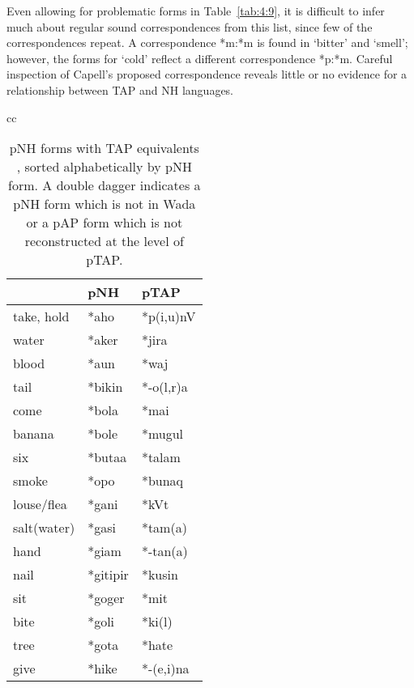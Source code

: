Even allowing for problematic forms in Table~\ref{tab:4:9}, it is difficult to infer much about regular sound correspondences from this list, since few of the correspondences repeat. A correspondence *m:*m is found in `bitter' and `smell'; however, the forms for `cold' reflect a different correspondence *p:*m. 
\enlargethispage{2em}
Careful inspection of Capell's proposed correspondence reveals little or no evidence for a relationship between TAP and NH languages.

\begin{table}[p]
\centering
\caption[pNH forms with TAP equivalents A-M]{pNH forms \citep[after][]{Wada1980} with TAP equivalents \citep[after][]{SchapperEtAlTVtimor}, sorted alphabetically by pNH form. A double dagger {\ddag} indicates a pNH form which is not in Wada or a pAP form which is not reconstructed at the level of pTAP.\footnotemark{}} 
\label{table_pNH}
\label{tab:4:10}
\footnotesize
\begin{tabular}{cc}
\mytopline
\begin{tabular}{lll}
 	&  \rm \textbf{pNH\ilt{proto-North-Halmahera}}	& \rm \textbf{pTAP\ilt{proto-Timor Alor Pantar}}\\
    \midrule
take, hold&   *aho	&   *p(i,u)nV {\ddag}\\
water	&   *aker	&  *jira\\
blood	&  *aun	&  *waj\\
tail	&  *bikin	&  *-o(l,r)a\footnotemark{}\\
{\lightgreycell}come	& {\lightgreycell} *bola	& {\lightgreycell} *mai {\ddag}\\
{\lightgreycell}banana	& {\lightgreycell} *bole{\ddag}	& {\lightgreycell} *mugul\\
six	&  *buta{\ng}a	&  *talam\\
smoke	&  *{\dDOT}opo	&  *bunaq {\ddag}\\
louse/flea	&  *gani	&  *kVt {\ddag}\\
salt(water)	&  *gasi	&  *tam(a)\\
hand	&  *giam	&  *-tan(a)\\
nail	&  *gitipir	&  *kusin {\ddag}\\
sit	&  *goger	&  *mit\\
bite	&  *goli	&  *ki(l)\\
{\lightgreycell}tree	& {\lightgreycell} *gota	& {\lightgreycell} *hate\\
give	&  *hike	&  *-(e,i)na\\

\end{tabular}
\end{tabular}
\end{table}
